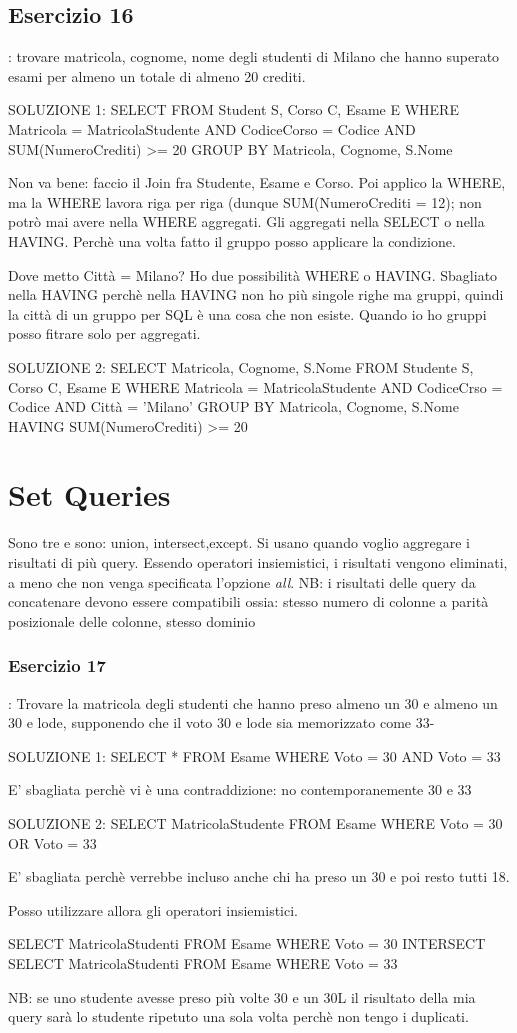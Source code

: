 \documentclass[12pt,a4paper]{book}
\begin{document}
\subsection{Esercizio 16}: trovare matricola, cognome, nome degli studenti di Milano che hanno superato esami per almeno un totale di almeno 20 crediti.

SOLUZIONE 1:
SELECT 
FROM Student S, Corso C, Esame E
WHERE Matricola = MatricolaStudente AND CodiceCorso = Codice AND SUM(NumeroCrediti) >= 20 
GROUP BY Matricola, Cognome, S.Nome

Non va bene: faccio il Join fra Studente, Esame e Corso. Poi applico la WHERE, ma la WHERE lavora riga per riga (dunque SUM(NumeroCrediti = 12); non potrò mai avere nella WHERE aggregati.
Gli aggregati nella SELECT o nella HAVING. Perchè una volta fatto il gruppo posso applicare la condizione.

Dove metto Città = Milano? Ho due possibilità WHERE o HAVING.
Sbagliato nella HAVING perchè nella HAVING non ho più singole righe ma gruppi, quindi la città di un gruppo per SQL è una cosa che non esiste. Quando io ho gruppi posso fitrare solo per aggregati.

SOLUZIONE 2:
SELECT Matricola, Cognome, S.Nome
FROM Studente S, Corso C, Esame E
WHERE Matricola = MatricolaStudente AND CodiceCrso = Codice AND Città = 'Milano'
GROUP BY Matricola, Cognome, S.Nome
HAVING SUM(NumeroCrediti) >= 20

\section{Set Queries}
Sono tre e sono: union, intersect,except.
Si usano quando voglio aggregare i risultati di più query. Essendo operatori insiemistici, i risultati vengono eliminati, a meno che non venga specificata l'opzione \emph{all}. 
NB: i risultati delle query da concatenare devono essere compatibili ossia:
    stesso numero di colonne
    a parità posizionale delle colonne, stesso dominio

\subsubsection{Esercizio 17}: Trovare la matricola degli studenti che hanno preso almeno un 30 e almeno un 30 e lode, supponendo che il voto 30 e lode sia memorizzato come 33-


SOLUZIONE 1: 
SELECT *
FROM Esame
WHERE Voto = 30 AND Voto = 33

E' sbagliata perchè vi è una contraddizione: no contemporanemente 30 e 33

SOLUZIONE 2:
SELECT MatricolaStudente
FROM Esame
WHERE Voto = 30 OR Voto = 33

E' sbagliata perchè verrebbe incluso anche chi ha preso un 30 e poi resto tutti 18.

Posso utilizzare allora gli operatori insiemistici.

SELECT MatricolaStudenti
FROM Esame
WHERE Voto = 30
INTERSECT
SELECT MatricolaStudenti
FROM Esame
WHERE Voto = 33

NB: se uno studente avesse preso più volte 30 e un 30L il risultato della mia query sarà lo studente ripetuto una sola volta perchè non tengo i duplicati.
\end{document}
